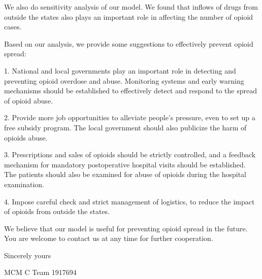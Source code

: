 We also do sensitivity analysis of our model. We found that inflows of drugs from outside the states also plays an important role in affecting the number of opioid cases.

Based on our analysis, we provide some suggestions to effectively prevent opioid spread:

1. National and local governments play an important role in detecting and preventing opioid overdose and abuse. Monitoring systems and early warning mechanisms should be established to effectively detect and respond to the spread of opioid abuse.

2. Provide more job opportunities to alleviate people's pressure, even to set up a free subsidy program. The local government should also publicize the harm of opioids abuse.

3. Prescriptions and sales of opioids should be strictly controlled, and a feedback mechanism for mandatory postoperative hospital visits should be established. The patients should also be examined for abuse of opioids during the hospital examination.

4. Impose careful check and strict management of logistics, to reduce the impact of opioids from outside the states.

We believe that our model is useful for preventing opioid spread in the future. You are welcome to contact us at any time for further cooperation.

\thispagestyle{empty}
{\raggedleft
Sincerely yours

MCM C Team 1917694\par
}